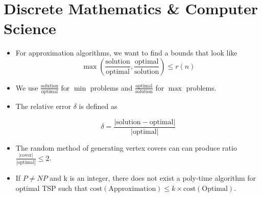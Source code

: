 \documentclass[12pt]{scrartcl}
\newcommand{\cost}[1]{\text{cost}\left(#1\right)}
\begin{document}
\begin{figure}
\end{figure}


\section{Discrete Mathematics \& Computer Science}
\begin{itemize}
    \item For approximation algorithms, we want to find a bounds that look like
        \begin{equation*}
            \max\left(\frac{\text{solution}}{\text{optimal}}, \frac{\text{optimal}}{\text{solution}}\right) \leq r(n)
        \end{equation*}

    \item We use $\frac{\text{solution}}{\text{optimal}}$ for $\min$ problems and $\frac{\text{optimal}}{\text{solution}}$ for $\max$ problems.

    \item The relative error $\delta$ is defined as

        \begin{equation*}
            \delta = \frac{|\text{solution} - \text{optimal}|}{|\text{optimal}|}
        \end{equation*}

    \item The random method of generating vertex covers can can produce ratio $\frac{|\text{cover}|}{|\text{optimal}|} \leq 2$.

    \item If $P \neq NP$ and k is an integer, there does not exist a poly-time algorithm for optimal TSP such that $\cost{\text{Approximation}} \leq k \times \cost{\text{Optimal}}$.
\end{itemize}
\end{document}
